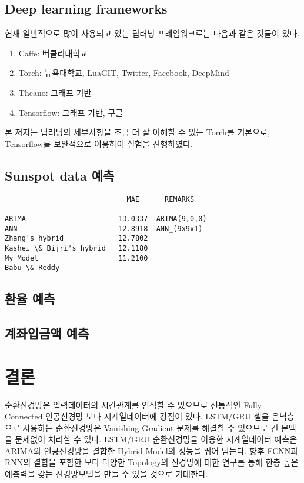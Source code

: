 \documentclass[a4paper, amsmath, 10pt, twocolumn]{oblivoir}
\begin{document}
\subsection{Deep learning frameworks}
현재 일반적으로 많이 사용되고 있는 딥러닝 프레임워크로는 다음과 같은 것들이 있다. 

\begin{enumerate}
\item Caffe: 버클리대학교
\item Torch: 뉴욕대학교, LuaGIT, Twitter, Facebook, DeepMind \cite{torch}
\item Theano: 그래프 기반
\item Tensorflow: 그래프 기반, 구글 \cite{tensorflow}
\end{enumerate}

본 저자는 딥러닝의 세부사항을 조금 더 잘 이해할 수 있는 Torch를 기본으로, Tensorflow를 보완적으로 이용하여 실험을 진행하였다.


\subsection{Sunspot data 예측}

\begin{verbatim}
                             MAE      REMARKS
------------------------  --------  ------------
ARIMA                      13.0337  ARIMA(9,0,0)  
ANN                        12.8918  ANN_(9x9x1)  
Zhang's hybrid             12.7802
Kashei \& Bijri's hybrid   12.1180
My Model                   11.2100
Babu \& Reddy               

\end{verbatim}
\subsection{환율 예측}


\subsection{계좌입금액 예측}



\section{결론}
순환신경망은 입력데이터의 시간관계를 인식할 수 있으므로 전통적인 Fully Connected 인공신경망 보다 시계열데이터에 강점이 있다. LSTM/GRU 셀을 은닉층으로 사용하는 순환신경망은 Vanishing Gradient 문제를 해결할 수 있으므로 긴 문맥을 문제없이 처리할 수 있다.  LSTM/GRU 순환신경망을 이용한 시계열데이터 예측은 ARIMA와 인공신경망을 결합한 Hybrid Model의 성능을 뛰어 넘는다. 향후 FCNN과 RNN의 결합을 포함한 보다 다양한 Topology의 신경망에 대한 연구를 통해 한층 높은 예측력을 갖는 신경망모델을 만들 수 있을 것으로 기대한다.





\newpage

\end{document}
